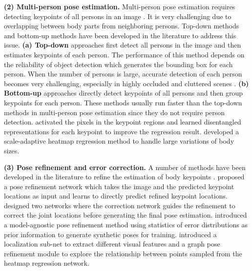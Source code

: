 \documentclass[runningheads]{llncs}
\begin{document}
\textbf{(2) Multi-person pose estimation.}
Multi-person pose estimation requires detecting keypoints of all persons in an image \cite{Fang_2017_ICCV}. It is very challenging due to overlapping between body parts from neighboring persons. Top-down methods and bottom-up methods have been developed in the literature to address this issue. \textbf{(a) Top-down} approaches \cite{He_2017_ICCV,DBLP:conf/eccv/SunXWLW18,DBLP:conf/cvpr/MoonCL19,DBLP:conf/cvpr/SuYXGW19} first detect all persons in the image and then estimates keypoints of each person. The performance of this method depends on the reliability of object detection which generates the bounding box for each person. When the number of persons is large, accurate detection of each person becomes very challenging, especially in highly occluded and cluttered scenes \cite{DBLP:conf/cvpr/PapandreouZKTTB17}.
\textbf{(b) Bottom-up} approaches \cite{Geng_2021_CVPR,DBLP:conf/cvpr/CaoSWS17,Luo_2021_CVPR} directly detect keypoints of all persons and then group keypoints for each person. These methods usually run faster than the top-down methods in multi-person pose estimation since they do not require person detection. \cite{Geng_2021_CVPR} activated the pixels in the keypoint regions and learned disentangled representations for each keypoint to improve the regression result. \cite{Luo_2021_CVPR} developed a scale-adaptive heatmap regression method to handle large variations of body sizes. 


\textbf{(3) Pose refinement and error correction.} A number of methods have been developed in the literature to refine the estimation of body keypoints \cite{9107502,DBLP:conf/cvpr/MoonCL19,DBLP:conf/eccv/WangLGDW20}.
\cite{8575519} proposed a pose refinement network  which takes  the image and the predicted keypoint locations as input and learns to directly predict refined keypoint locations. \cite{9107502} designed two networks where the correction network guides the refinement to correct the joint locations before generating the final pose estimation. \cite{DBLP:conf/cvpr/MoonCL19} introduced a model-agnostic pose refinement method using statistics of error distributions as prior information to generate synthetic poses for training.  \cite{DBLP:conf/eccv/WangLGDW20}  introduced a localization sub-net to extract different visual features and a graph pose refinement module to explore the relationship between points sampled from the heatmap regression network. 
\end{document}
